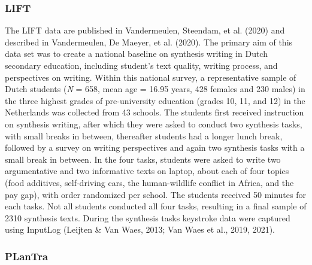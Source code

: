 \documentclass[
  english,
  man,floatsintext]{apa7}
\begin{document}
\hypertarget{lift}{%
\subsubsection{LIFT}\label{lift}}

The LIFT data are published in Vandermeulen, Steendam, et al. (2020) and described in Vandermeulen, De Maeyer, et al. (2020). The primary aim of this data set was to create a national baseline on synthesis writing in Dutch secondary education, including student's text quality, writing process, and perspectives on writing. Within this national survey, a representative sample of Dutch students (\emph{N} = 658, mean age = 16.95 years, 428 females and 230 males) in the three highest grades of pre-university education (grades 10, 11, and 12) in the Netherlands was collected from 43 schools. The students first received instruction on synthesis writing, after which they were asked to conduct two synthesis tasks, with small breaks in between, thereafter students had a longer lunch break, followed by a survey on writing perspectives and again two synthesis tasks with a small break in between. In the four tasks, students were asked to write two argumentative and two informative texts on laptop, about each of four topics (food additives, self-driving cars, the human-wildlife conflict in Africa, and the pay gap), with order randomized per school. The students received 50 minutes for each tasks. Not all students conducted all four tasks, resulting in a final sample of 2310 synthesis texts. During the synthesis tasks keystroke data were captured using InputLog (Leijten \& Van Waes, 2013; Van Waes et al., 2019, 2021).

\hypertarget{plantra}{%
\subsubsection{PLanTra}\label{plantra}}
\end{document}
